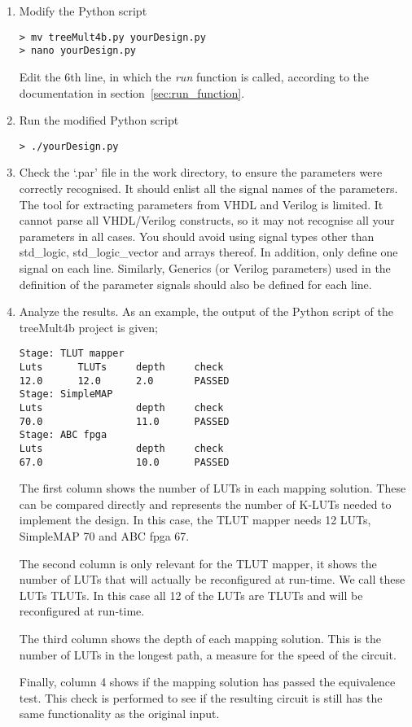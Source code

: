 \documentclass[a4paper,oneside]{memoir}
\begin{document}
\begin{enumerate}
\item Modify the Python script\\
\begin{lstlisting}
> mv treeMult4b.py yourDesign.py
> nano yourDesign.py
\end{lstlisting}
Edit the 6th line, in which the \emph{run} function is called, according to the documentation in section~\ref{sec:run_function}.
\item Run the modified Python script
\begin{lstlisting}
> ./yourDesign.py
\end{lstlisting}
\item \label{sec:check_par}Check the `.par' file in the work directory, to ensure the parameters were correctly recognised. It should enlist all the signal names of the parameters. \\
The tool for extracting parameters from VHDL and Verilog is limited. It cannot parse all VHDL/Verilog constructs, so it may not recognise all your parameters in all cases. You should avoid using signal types other than std\_logic, std\_logic\_vector and arrays thereof. In addition, only define one signal on each line. Similarly, Generics (or Verilog parameters) used in the definition of the parameter signals should also be defined for each line.

\item Analyze the results. As an example, the output of the Python script of the treeMult4b project is given;\\

\begin{lstlisting}
Stage: TLUT mapper
Luts      TLUTs     depth     check
12.0      12.0      2.0       PASSED    
Stage: SimpleMAP
Luts                depth     check     
70.0                11.0      PASSED    
Stage: ABC fpga
Luts                depth     check     
67.0                10.0      PASSED 
\end{lstlisting}

The first column shows the number of LUTs in each mapping solution. These can be compared directly and represents the number of K-LUTs needed to implement the design. In this case, the TLUT mapper needs 12 LUTs, SimpleMAP 70 and ABC fpga 67.

The second column is only relevant for the TLUT mapper, it shows the number of LUTs that will actually be reconfigured at run-time. We call these LUTs TLUTs. In this case all 12 of the LUTs are TLUTs and will be reconfigured at run-time.

The third column shows the depth of each mapping solution. This is the number of LUTs in the longest path, a measure for the speed of the circuit. 

Finally, column 4 shows if the mapping solution has passed the equivalence test. This check is performed to see if the resulting circuit is still has the same functionality as the original input.


\end{enumerate}
\end{document}

